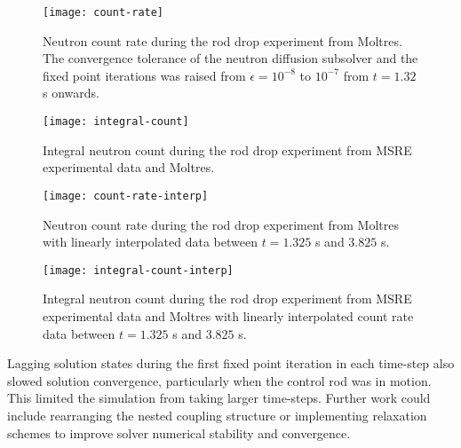 \begin{figure}[p]
  \centering
  \texttt{[image: count-rate]}
  \caption{Neutron count rate during the rod drop experiment from Moltres. The convergence tolerance
  of the neutron diffusion subsolver and the fixed point iterations was raised from $\epsilon=10^{-8}$
  to $10^{-7}$ from $t=1.32$ s onwards.}
  \label{fig:count-rate}
  \texttt{[image: integral-count]}
  \caption{Integral neutron count during the rod drop experiment from \gls{MSRE} experimental data
  and Moltres.}
  \label{fig:integral-count}
\end{figure}

\begin{figure}[p]
  \centering
  \texttt{[image: count-rate-interp]}
  \caption{Neutron count rate during the rod drop experiment from Moltres with linearly interpolated
    data between $t=1.325$ s and $3.825$ s.}
  \label{fig:count-rate-interp}
  \texttt{[image: integral-count-interp]}
  \caption{Integral neutron count during the rod drop experiment from \gls{MSRE} experimental data
  and Moltres with linearly interpolated count rate data between $t=1.325$ s and $3.825$ s.}
  \label{fig:integral-count-interp}
\end{figure}

Lagging solution states during the first fixed point iteration in each time-step also slowed
solution convergence, particularly when the control rod was in motion. This limited the simulation
from taking larger time-steps. Further work could include rearranging the nested coupling structure
or implementing relaxation schemes to improve solver numerical stability and convergence.


